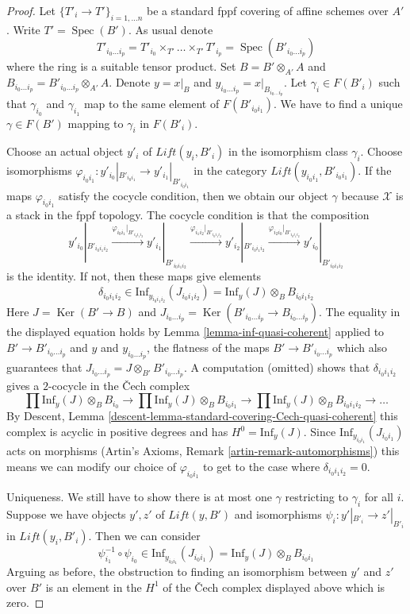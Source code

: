 \documentclass[10pt,a4paper]{amsart}
\theoremstyle{plain}
\theoremstyle{definition}
\theoremstyle{remark}
\numberwithin{equation}{subsection}
\def\Spec{\mathop{\mathrm{Spec}}}
\def\Ker{\mathop{\mathrm{Ker}}}
\begin{document}
\begin{proof}
Let $\{T'_i \to T'\}_{i = 1, \ldots n}$ be a standard fppf covering
of affine schemes over $A'$. Write $T' = \Spec(B')$. As usual denote
$$
T'_{i_0 \ldots i_p} =
T'_{i_0} \times_{T'} \ldots \times_{T'} T'_{i_p} = \Spec(B'_{i_0 \ldots i_p})
$$
where the ring is a suitable tensor product.
Set $B = B' \otimes_{A'} A$ and
$B_{i_0 \ldots i_p} = B'_{i_0 \ldots i_p} \otimes_{A'} A$.
Denote $y = x|_B$ and $y_{i_0 \ldots i_p} = x|_{B_{i_0 \ldots i_p}}$.
Let $\gamma_i \in F(B'_i)$ such that $\gamma_{i_0}$ and $\gamma_{i_1}$
map to the same element of $F(B'_{i_0i_1})$.
We have to find a unique $\gamma \in F(B')$ mapping to
$\gamma_i$ in $F(B'_i)$.

\medskip\noindent
Choose an actual object $y'_i$ of $\textit{Lift}(y_i, B'_i)$
in the isomorphism class $\gamma_i$.
Choose isomorphisms
$\varphi_{i_0i_1} : y'_{i_0}|_{B'_{i_0i_1}} \to y'_{i_1}|_{B'_{i_0i_1}}$
in the category $\textit{Lift}(y_{i_0i_1}, B'_{i_0i_1})$.
If the maps $\varphi_{i_0i_1}$ satisfy the cocycle condition,
then we obtain our object $\gamma$ because $\mathcal{X}$ is
a stack in the fppf topology. The cocycle condition is that the
composition
$$
y'_{i_0}|_{B'_{i_0i_1i_2}}
\xrightarrow{\varphi_{i_0i_1}|_{B'_{i_0i_1i_2}}}
y'_{i_1}|_{B'_{i_0i_1i_2}}
\xrightarrow{\varphi_{i_1i_2}|_{B'_{i_0i_1i_2}}}
y'_{i_2}|_{B'_{i_0i_1i_2}}
\xrightarrow{\varphi_{i_2i_0}|_{B'_{i_0i_1i_2}}}
y'_{i_0}|_{B'_{i_0i_1i_2}}
$$
is the identity. If not, then these maps give elements
$$
\delta_{i_0i_1i_2} \in
\text{Inf}_{y_{i_0i_1i_2}}(J_{i_0i_1i_2}) =
\text{Inf}_y(J) \otimes_B B_{i_0i_1i_2}
$$
Here $J = \Ker(B' \to B)$ and
$J_{i_0 \ldots i_p} = \Ker(B'_{i_0 \ldots i_p} \to B_{i_0 \ldots i_p})$.
The equality in the displayed equation holds by
Lemma \ref{lemma-inf-quasi-coherent} applied to
$B' \to B'_{i_0 \ldots i_p}$ and $y$ and $y_{i_0 \ldots i_p}$,
the flatness of the maps $B' \to B'_{i_0 \ldots i_p}$
which also guarantees that
$J_{i_0 \ldots i_p} = J \otimes_{B'} B'_{i_0 \ldots i_p}$.
A computation (omitted) shows that $\delta_{i_0i_1i_2}$ gives
a $2$-cocycle in the {\v C}ech complex
$$
\prod \text{Inf}_y(J) \otimes_B B_{i_0} \to
\prod \text{Inf}_y(J) \otimes_B B_{i_0i_1} \to
\prod \text{Inf}_y(J) \otimes_B B_{i_0i_1i_2} \to \ldots
$$
By Descent, Lemma \ref{descent-lemma-standard-covering-Cech-quasi-coherent}
this complex is acyclic in positive degrees and has $H^0 = \text{Inf}_y(J)$.
Since $\text{Inf}_{y_{i_0i_1}}(J_{i_0i_1})$ acts on
morphisms (Artin's Axioms, Remark \ref{artin-remark-automorphisms})
this means we can modify our choice of $\varphi_{i_0i_1}$
to get to the case where $\delta_{i_0i_1i_2} = 0$.

\medskip\noindent
Uniqueness. We still have to show there is at most one $\gamma$ restricting
to $\gamma_i$ for all $i$. Suppose we have objects $y', z'$ of
$\textit{Lift}(y, B')$ and isomorphisms $\psi_i : y'|_{B'_i} \to z'|_{B'_i}$
in $\textit{Lift}(y_i, B'_i)$. Then we can consider
$$
\psi_{i_1}^{-1} \circ \psi_{i_0} \in
\text{Inf}_{y_{i_0i_1}}(J_{i_0i_1}) =
\text{Inf}_y(J) \otimes_B B_{i_0i_1}
$$
Arguing as before, the obstruction to finding an isomorphism between
$y'$ and $z'$ over $B'$ is an element in the $H^1$ of the
{\v C}ech complex displayed above which is zero.
\end{proof}
\end{document}

